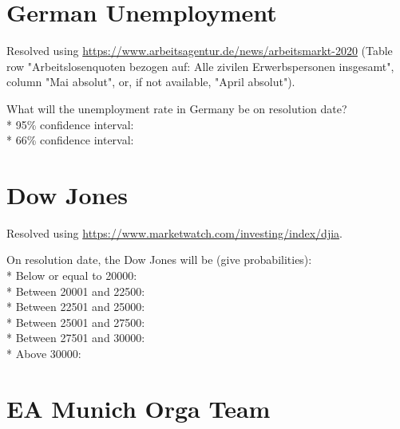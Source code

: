 \documentclass{article}
\begin{document}
\section*{German Unemployment}

Resolved using
\href{https://www.arbeitsagentur.de/news/arbeitsmarkt-2020}{https://www.arbeitsagentur.de/news/arbeitsmarkt-2020}
(Table row "Arbeitslosenquoten bezogen auf: Alle zivilen Erwerbspersonen
insgesamt", column "Mai absolut", or, if not available, "April absolut").

\vspace{0.2cm}

What will the unemployment rate in Germany be on resolution date?\\*
95\% confidence interval: \null\hfill\underline{\hspace{8cm}}\\*
66\% confidence interval: \null\hfill\underline{\hspace{8cm}}

\section*{Dow Jones}

Resolved using
\href{https://www.marketwatch.com/investing/index/djia}{https://www.marketwatch.com/investing/index/djia}.

\vspace{0.3cm}

On resolution date, the Dow Jones will be (give probabilities):\\*
Below or equal to 20000: \null\hfill\underline{\hspace{5cm}}\\*
Between 20001 and 22500: \null\hfill\underline{\hspace{5cm}}\\*
Between 22501 and 25000: \null\hfill\underline{\hspace{5cm}}\\*
Between 25001 and 27500: \null\hfill\underline{\hspace{5cm}}\\*
Between 27501 and 30000: \null\hfill\underline{\hspace{5cm}}\\*
Above 30000: \null\hfill\underline{\hspace{5cm}}

\section*{EA Munich Orga Team}
\end{document}
